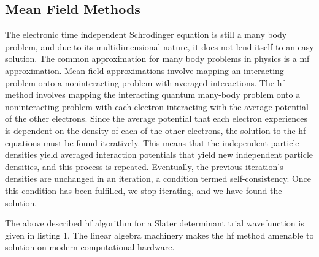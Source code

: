 \subsection{Mean Field Methods}
The electronic time independent Schrodinger equation is still a many body problem, and due to its multidimensional nature, it does not lend itself to an easy solution.
The common approximation for many body problems in physics is a \gls{mf} approximation.
Mean-field approximations involve mapping an interacting problem onto a noninteracting problem with averaged interactions.
The \gls{hf} method involves mapping the interacting quantum many-body problem onto a noninteracting problem with each electron interacting with the average potential of the other electrons.
Since the average potential that each electron experiences is dependent on the density of each of the other electrons, the solution to the \gls{hf} equations must be found iteratively.
This means that the independent particle densities yield averaged interaction potentials that yield new independent particle densities, and this process is repeated.
Eventually, the previous iteration's densities are unchanged in an iteration, a condition termed self-consistency.
Once this condition has been fulfilled, we stop iterating, and we have found the  solution.

The above described \gls{hf} algorithm for a Slater determinant trial wavefunction is given in listing 1.
The linear algebra machinery makes the \gls{hf} method amenable to solution on modern computational hardware.
